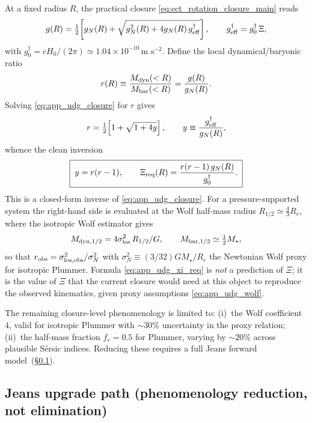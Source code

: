 At a fixed radius $R$, the practical closure
\eqref{eq:ect_rotation_closure_main} reads
\begin{equation}
g(R)=\tfrac{1}{2}\!\left[g_N(R)+\sqrt{g_N^2(R)+4g_N(R)\,g^\dagger_{\rm eff}}\right],
\qquad
g^\dagger_{\rm eff}=g^\dagger_0\,\Xi,
\label{eq:app_udg_closure}
\end{equation}
with $g^\dagger_0=cH_0/(2\pi)\simeq 1.04\times 10^{-10}\,\text{m s}^{-2}$.
Define the local dynamical/baryonic ratio
\begin{equation}
r(R)\equiv\frac{M_{\rm dyn}(<R)}{M_{\rm bar}(<R)}
=\frac{g(R)}{g_N(R)}.
\end{equation}
Solving \eqref{eq:app_udg_closure} for $r$ gives
\begin{equation}
r=\tfrac{1}{2}\!\left[1+\sqrt{1+4y}\right],
\qquad y\equiv\frac{g^\dagger_{\rm eff}}{g_N(R)},
\end{equation}
whence the clean inversion
\begin{equation}
\boxed{\;
y=r(r-1),
\qquad
\Xi_{\rm req}(R)
=\frac{r(r-1)\,g_N(R)}{g^\dagger_0}.
\;}
\label{eq:app_udg_xi_req}
\end{equation}
This is a closed-form inverse of
\eqref{eq:app_udg_closure}.  For a pressure-supported system the
right-hand side is evaluated at the Wolf half-mass radius
$R_{1/2}\simeq\tfrac{4}{3}R_e$, where the isotropic Wolf estimator
\cite{Wolf2010} gives
\begin{equation}
M_{\rm dyn,1/2}=4\sigma_{\rm los}^2\,R_{1/2}/G,
\qquad
M_{\rm bar,1/2}\simeq\tfrac{1}{2}M_\star,
\label{eq:app_udg_wolf}
\end{equation}
so that $r_{\rm obs}=\sigma_{\rm los,obs}^2/\sigma_N^2$ with
$\sigma_N^2\equiv (3/32)GM_\star/R_e$ the Newtonian Wolf proxy for
isotropic Plummer.  Formula \eqref{eq:app_udg_xi_req} is \emph{not}
a prediction of $\Xi$; it is the value of $\Xi$ that the current
closure would need at this object to reproduce the observed
kinematics, given proxy assumptions \eqref{eq:app_udg_wolf}.

The remaining closure-level phenomenology is limited to: (i)~the
Wolf coefficient $4$, valid for isotropic Plummer with $\sim 30\%$
uncertainty in the proxy relation; (ii)~the half-mass fraction
$f_e=0.5$ for Plummer, varying by $\sim 20\%$ across plausible
S\'ersic indices.  Reducing these requires a full Jeans forward
model~(\S\ref{app:udg:jeans_upgrade}).

\subsection{Jeans upgrade path (phenomenology reduction, not elimination)}
\label{app:udg:jeans_upgrade}

